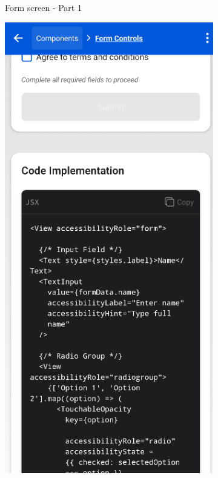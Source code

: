 \begin{enumerate}
\begin{itemize}
\begin{figure}[ht]
\begin{subfigure}[b]{0.48\textwidth}
                \caption{Form screen - Part 1}
                \label{fig:form-left}
            \end{subfigure}
            \hfill
            \begin{subfigure}[b]{0.48\textwidth}
                \centering
                \includegraphics[width=\linewidth, alt={Second part of the Form screen}]{img/form2.png}

\end{subfigure}
\end{figure}
\end{itemize}
\end{enumerate}
